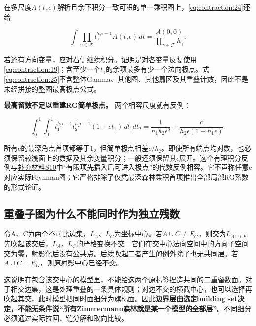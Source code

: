 \documentclass[11pt,a4paper,oneside]{ctexart}
\theoremstyle{cnplain}
\theoremstyle{definition}
\theoremstyle{remark}
\numberwithin{equation}{section}
\newcommand{\otherref}[2]{\href{#1.pdf}{#2}}
\begin{document}
在多尺度\(A(t,\epsilon )\)解析且余下积分一致可积的单一乘积图上，\eqref{eq:contraction:24}还给

\begin{equation}
[\epsilon^{-|\mathscr F|}]\int\prod_{\gamma\in\mathscr F}
                t_\gamma^{h_\gamma\epsilon-1}A(t,\epsilon)\,dt
                       =\frac{A(0,0)}{\prod_{\gamma\in\mathscr F}h_\gamma}.
                                                                    \label{eq:contraction:25}
\end{equation}

若还有方向变量，应对右侧继续积分。证明是对各变量反复使用\eqref{eq:contraction:19}；含至少一个\(t_\gamma \)的余项最多有少一个法向极点。式\eqref{eq:contraction:25}不含整体Gamma、其他图、其他扇区及其重叠计数，因此不是未经拼接的整图最高极点公式。

\textbf{最高留数不足以重建RG简单极点。} 两个相容尺度就有反例：

\begin{equation}
\int_0^1\!\int_0^1
 t_1^{h_1\epsilon-1}t_2^{h_2\epsilon-1}(1+c t_1)\,dt_1dt_2
 =\frac1{h_1h_2\epsilon^2}
                  +\frac{c}{h_2\epsilon(1+h_1\epsilon)}.         \label{eq:contraction:25a}
\end{equation}

所有c的最深角点首项都等于1，但简单极点相差\(c/h_2\)。即使所有端点均对数，也必须保留较浅面上的数据及其余变量积分；一般还须保留其\(\epsilon \)展开。这个有理积分反例与\otherref{feynman_periods_supplement}{补充材料S10}中``有限项先插入后可进入极点''的代数反例相容。它不声称任意c对应实际Feynman图；它严格排除了仅凭最深森林乘积首项推出全部局部RG系数的形式论证。


\subsection{重叠子图为什么不能同时作为独立残数}\label{sec:contraction:7}

令A、C为两个不可比边集，\(L_A\)、\(L_C\)为坐标中心。若\(A\cup C\ne E_G\)，则交为\(L_{A\cup C}\)。先吹起该交后，\(L_A\)、\(L_C\)的严格变换不交：它们在交中心法向空间中的方向子空间交为零，射影化后没有公共点。后续吹起二者产生的例外除子也无共同层。若\(A\cup C=E_G\)，则原射影中心已经不交。

这说明在包含该交中心的模型里，不能给这两个原标签捏造共同的二重留数面。对于相交边集，这是处理重叠的一条具体规则；对边不交的横截中心，也可以选择再吹起其交，此时模型把同时面细分为旗标面。因此\textbf{边界层由选定building set决定，不能无条件说``所有Zimmermann森林就是某一个模型的全部层''}。不同细分必须通过实际拉回、链分解和取向比较。
\end{document}
